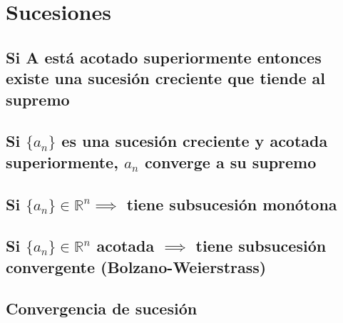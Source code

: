 \section{Sucesiones}

\subsection{Si A está acotado superiormente entonces existe una sucesión creciente que tiende al supremo}


\subsection{Si $\{a_n\}$ es una sucesión creciente y acotada superiormente, $a_n$ converge a su supremo}


\subsection{Si $\{a_n\} \in \mathbb{R}^n \implies$ tiene subsucesión monótona}


\subsection{Si $\{a_n\} \in \mathbb{R}^n$ acotada $\implies$ tiene subsucesión convergente (Bolzano-Weierstrass)}


\subsection{Convergencia de sucesión}

